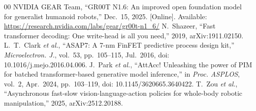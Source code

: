 \begin{thebibliography}{00}
 NVIDIA GEAR Team, ``GR00T N1.6: An improved open foundation model for generalist humanoid robots,'' Dec.~15, 2025. [Online]. Available: \url{https://research.nvidia.com/labs/gear/gr00t-n1_6/}
 N.~Shazeer, ``Fast transformer decoding: One write-head is all you need,'' 2019, arXiv:1911.02150.
 L.~T.~Clark \emph{et al.}, ``ASAP7: A 7-nm FinFET predictive process design kit,'' \emph{Microelectron. J.}, vol.~53, pp.~105--115, Jul.~2016, doi: 10.1016/j.mejo.2016.04.006.
 J.~Park \emph{et al.}, ``AttAcc! Unleashing the power of PIM for batched transformer-based generative model inference,'' in \emph{Proc. ASPLOS}, vol.~2, Apr.~2024, pp.~103--119, doi: 10.1145/3620665.3640422.
 T.~Zou \emph{et al.}, ``Asynchronous fast-slow vision-language-action policies for whole-body robotic manipulation,'' 2025, arXiv:2512.20188.
\end{thebibliography}
